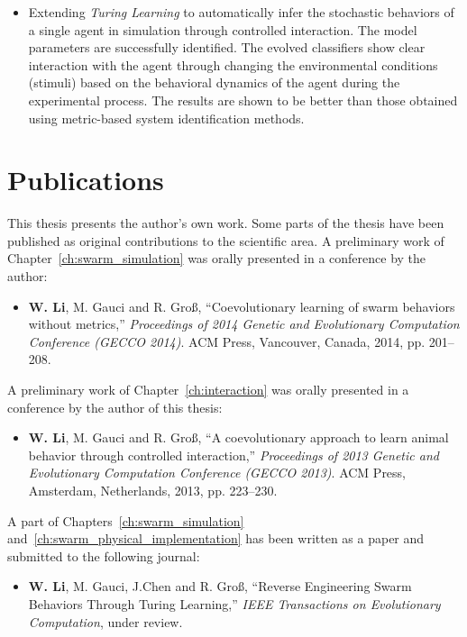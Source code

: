 \begin{itemize}
\item Extending \textit{Turing Learning} to automatically infer the stochastic behaviors of a single agent in simulation through controlled interaction. The model parameters are successfully identified. The evolved classifiers show clear interaction with the agent through changing the environmental conditions (stimuli) based on the behavioral dynamics of the agent during the experimental process. The results are shown to be better than those obtained using metric-based system identification methods. 
\end{itemize}

\section{Publications}

This thesis presents the author's own work. Some parts of the thesis have been published as original contributions to the scientific area. A preliminary work of Chapter~\ref{ch:swarm_simulation} was orally presented in a conference by the author:
\begin{itemize}
%
\item \textbf{W. Li}, M. Gauci and R. Gro{\ss}, ``Coevolutionary learning of swarm behaviors without metrics,'' \textit{Proceedings of 2014 Genetic and Evolutionary Computation Conference (GECCO 2014)}. ACM Press, Vancouver, Canada, 2014, pp. 201--208.
%
\end{itemize}

A preliminary work of Chapter~\ref{ch:interaction} was orally presented in a conference by the author of this thesis:
\begin{itemize}
%
\item \textbf{W. Li}, M. Gauci and R. Gro{\ss}, ``A coevolutionary approach to learn animal behavior through controlled interaction,'' \textit{Proceedings of 2013 Genetic and Evolutionary Computation Conference (GECCO 2013)}. ACM Press, Amsterdam, Netherlands, 2013, pp. 223--230.
%
\end{itemize}

A part of Chapters~\ref{ch:swarm_simulation} and~\ref{ch:swarm_physical_implementation} has been written as a paper and submitted to the following journal:
\begin{itemize}
%
\item \textbf{W. Li}, M. Gauci, J.Chen and R. Gro{\ss}, ``Reverse Engineering Swarm Behaviors Through Turing Learning,'' \textit{IEEE Transactions on Evolutionary Computation}, under review.
%
\end{itemize}

